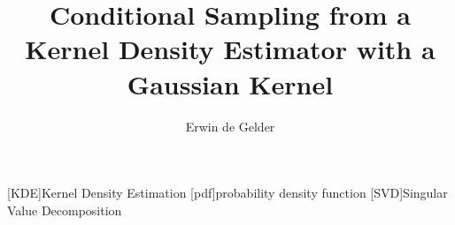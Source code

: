 \documentclass{article}
\title{Conditional Sampling from a Kernel Density Estimator with a Gaussian Kernel}
\author{Erwin de Gelder}
\date{}
\begin{document}
\begin{acronym}[AAAAAAAA]
	[KDE]{Kernel Density Estimation}
	[pdf]{probability density function}
	[SVD]{Singular Value Decomposition}
\end{acronym}

\maketitle











\printbibliography
\end{document}
